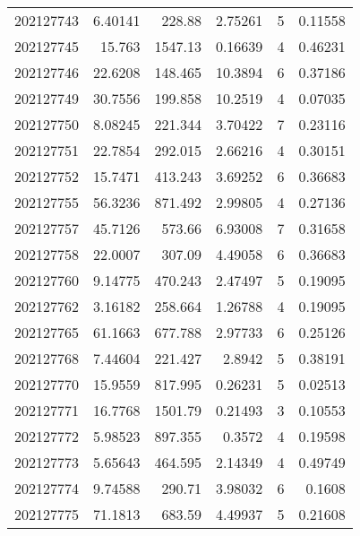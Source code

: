 \begin{tabular}{rrrrrr}
 202127743 &          6.40141 &      228.88   &            2.75261 &           5 & 0.11558 \\
 202127745 &         15.763   &     1547.13   &            0.16639 &           4 & 0.46231 \\
 202127746 &         22.6208  &      148.465  &           10.3894  &           6 & 0.37186 \\
 202127749 &         30.7556  &      199.858  &           10.2519  &           4 & 0.07035 \\
 202127750 &          8.08245 &      221.344  &            3.70422 &           7 & 0.23116 \\
 202127751 &         22.7854  &      292.015  &            2.66216 &           4 & 0.30151 \\
 202127752 &         15.7471  &      413.243  &            3.69252 &           6 & 0.36683 \\
 202127755 &         56.3236  &      871.492  &            2.99805 &           4 & 0.27136 \\
 202127757 &         45.7126  &      573.66   &            6.93008 &           7 & 0.31658 \\
 202127758 &         22.0007  &      307.09   &            4.49058 &           6 & 0.36683 \\
 202127760 &          9.14775 &      470.243  &            2.47497 &           5 & 0.19095 \\
 202127762 &          3.16182 &      258.664  &            1.26788 &           4 & 0.19095 \\
 202127765 &         61.1663  &      677.788  &            2.97733 &           6 & 0.25126 \\
 202127768 &          7.44604 &      221.427  &            2.8942  &           5 & 0.38191 \\
 202127770 &         15.9559  &      817.995  &            0.26231 &           5 & 0.02513 \\
 202127771 &         16.7768  &     1501.79   &            0.21493 &           3 & 0.10553 \\
 202127772 &          5.98523 &      897.355  &            0.3572  &           4 & 0.19598 \\
 202127773 &          5.65643 &      464.595  &            2.14349 &           4 & 0.49749 \\
 202127774 &          9.74588 &      290.71   &            3.98032 &           6 & 0.1608  \\
 202127775 &         71.1813  &      683.59   &            4.49937 &           5 & 0.21608 \\

\end{tabular}
